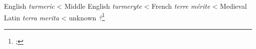 \begin{etymology}\label{ety:turmeric}
English \textit{turmeric}
< Middle English \textit{turmeryte }
< French \textit{terre mérite}
< Medieval Latin \textit{terra merita}
< unknown \textit{?}\footnote{; }
\end{etymology}